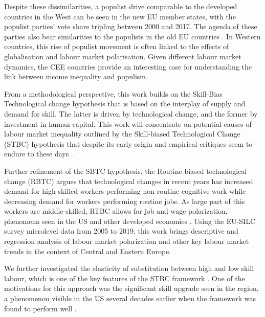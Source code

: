 \documentclass[11pt]{article}
\begin{document}
Despite these dissimilarities, a populist drive comparable to the developed countries in the West can be seen in the new EU member states, with the populist parties' vote share tripling between 2000 and 2017. The agenda of these parties also bear similarities to the populists in the old EU countries \citep{orenstein2022work}. In Western countries, this rise of populist movement is often linked to the effects of globalisation and labour market polarisation. Given different labour market dynamics, the CEE countries provide an interesting case for understanding the link between income inequality and populism. 



From a methodological perspective, this work builds on the Skill-Bias Technological change hypothesis \citep{katz1992changes} that is based on the interplay of supply and demand for skill. The latter is driven by technological change, and the former by investment in human capital. This work will concentrate on potential causes of labour market inequality outlined by the Skill-biased Technological Change (STBC) hypothesis that despite its early origin \citep{katz1992changes} and empirical critiques seem to endure to these days \citep{aziz2021between, goldin2020extending}.

Further refinement of the SBTC hypothesis, the Routine-biased technological change (RBTC)  argues that technological changes in recent years has increased demand for high-skilled workers performing non-routine cognitive work while decreasing demand for workers performing routine jobs. As large part of this workers are middle-skilled, RTBC allows for  job and wage polarization, phenomena seen in the US and other developed economies \citep{rodrik2020economic, temin2018vanishing}. Using the EU-SILC survey microlevel data from 2005 to 2019, this work brings descriptive and regression analysis of labour market polarization and other key labour market trends in the context of Central and Eastern Europe.


We further investigated the elasticity of substitution between high and low skill labour, which is one of the key features of the STBC framework \citep{katz1992changes}. One of the motivations for this approach was the significant skill upgrade seen in the region, a phenomenon visible in the US several decades earlier when the framework was found to perform well \citep{hardy2018educational}.
\end{document}
